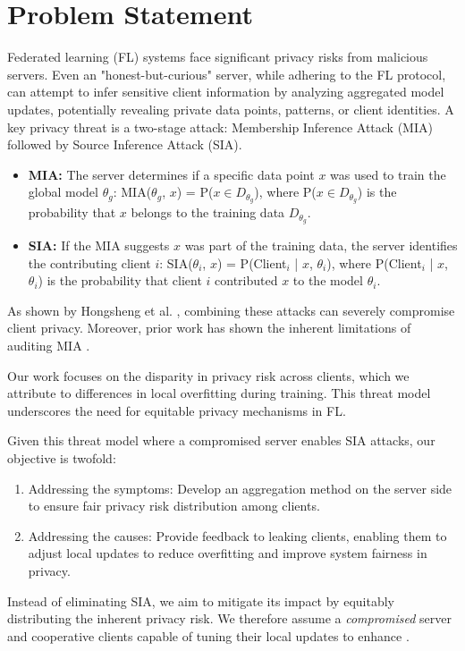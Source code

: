 \section{Problem Statement}\label{sec:threatmodel}

 


Federated learning (FL) systems face significant privacy risks from malicious servers. Even an "honest-but-curious" server, while adhering to the FL protocol, can attempt to infer sensitive client information by analyzing aggregated model updates, potentially revealing private data points, patterns, or client identities. A key privacy threat is a two-stage attack: Membership Inference Attack (MIA) followed by Source Inference Attack (SIA).

\begin{itemize}[noitemsep, topsep=0pt]
    \item \textbf{MIA:} The server determines if a specific data point $x$ was used to train the global model $\theta_g$: MIA($\theta_g$, $x$) = P($x \in D_{\theta_g}$), where P($x \in D_{\theta_g}$) is the probability that $x$ belongs to the training data $D_{\theta_g}$.
    \item \textbf{SIA:} If the MIA suggests $x$ was part of the training data, the server identifies the contributing client $i$: SIA($\theta_i$, $x$) = P(Client$_i$ | $x$, $\theta_i$), where P(Client$_i$ | $x$, $\theta_i$) is the probability that client $i$ contributed $x$ to the model $\theta_i$.
\end{itemize}

As shown by Hongsheng et al. \cite{BG_SIA_2}, combining these attacks can severely compromise client privacy. Moreover, prior work has shown the inherent limitations of auditing MIA \cite{chang2024efficient}. 

Our work focuses on the disparity in privacy risk across clients, which we attribute to differences in local overfitting during training. This threat model underscores the need for equitable privacy mechanisms in FL. 

Given this threat model %
where a compromised server enables SIA attacks, our objective is twofold:

\begin{enumerate}[noitemsep, topsep=0pt, start=1,label={(\bfseries O\arabic*):}]
    \item Addressing the symptoms: Develop an aggregation method on the server side to ensure fair privacy risk distribution among clients.
    \item Addressing the causes: Provide feedback to leaking clients, enabling them to adjust local updates to reduce overfitting and improve system fairness in privacy.
\end{enumerate}

Instead of eliminating SIA, we aim to mitigate its impact by equitably distributing the inherent privacy risk. We therefore assume a \textit{compromised} server and cooperative clients capable of tuning their local updates to enhance \sysname.
